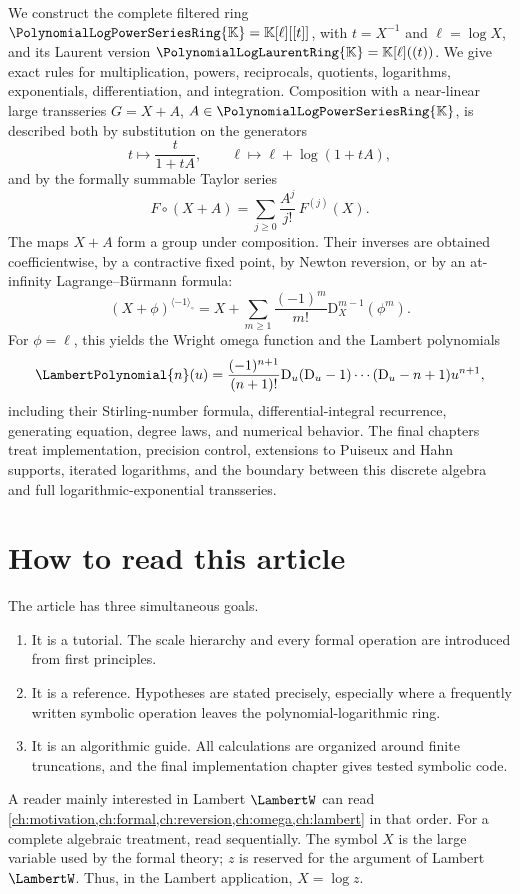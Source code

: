 \documentclass[11pt,oneside,openany]{book}
\newcommand{\K}{\mathbb{K}}
\newcommand{\Rring}{\PolynomialLogPowerSeriesRing{\K}}
\newcommand{\Pring}{\PolynomialLogLaurentRing{\K}}
\newcommand{\compose}{\mathbin{\circ}}
\newcommand{\rev}{^{\langle-1\rangle_{\circ}}}
\newcommand{\D}{\mathrm{D}}
\begin{document}
We construct the complete filtered ring
\(\Rring=\K[\ell][[t]]\), with \(t=X^{-1}\) and
\(\ell=\log X\), and its Laurent version
\(\Pring=\K[\ell]((t))\).  We give exact rules for multiplication, powers,
reciprocals, quotients, logarithms, exponentials, differentiation, and
integration.  Composition with a near-linear large transseries
\(G=X+A\), \(A\in\Rring\), is described both by substitution on the generators
\[
  t\mapsto \frac{t}{1+tA},
  \qquad
  \ell\mapsto \ell+\log(1+tA),
\]
and by the formally summable Taylor series
\[
  F\compose(X+A)=\sum_{j\geq0}\frac{A^j}{j!}\,F^{(j)}(X).
\]
The maps \(X+A\) form a group under composition.  Their inverses are obtained
coefficientwise, by a contractive fixed point, by Newton reversion, or by an
at-infinity Lagrange--Bürmann formula:
\[
  (X+\phi)\rev
  =X+\sum_{m\geq1}\frac{(-1)^m}{m!}
       \D_X^{m-1}\!\left(\phi^m\right).
\]
For \(\phi=\ell\), this yields the Wright omega function and the Lambert
polynomials
\[
 \LambertPolynomial{n}(u)=\frac{(-1)^{n+1}}{(n+1)!}
   \D_u(\D_u-1)\cdots(\D_u-n+1)u^{n+1},
\]
including their Stirling-number formula, differential-integral recurrence,
generating equation, degree laws, and numerical behavior.  The final chapters
treat implementation, precision control, extensions to Puiseux and Hahn
supports, iterated logarithms, and the boundary between this discrete algebra
and full logarithmic-exponential transseries.

\chapter*{How to read this article}
The article has three simultaneous goals.

\begin{enumerate}
\item It is a tutorial.  The scale hierarchy and every formal operation are
introduced from first principles.
\item It is a reference.  Hypotheses are stated precisely, especially where a
frequently written symbolic operation leaves the polynomial-logarithmic ring.
\item It is an algorithmic guide.  All calculations are organized around finite
truncations, and the final implementation chapter gives tested symbolic code.
\end{enumerate}

A reader mainly interested in Lambert \(\LambertW\) can read
\cref{ch:motivation,ch:formal,ch:reversion,ch:omega,ch:lambert} in that order.
For a complete algebraic treatment, read sequentially.  The symbol \(X\) is the
large variable used by the formal theory; \(z\) is reserved for the argument of
Lambert \(\LambertW\).  Thus, in the Lambert application, \(X=\log z\).
\end{document}
